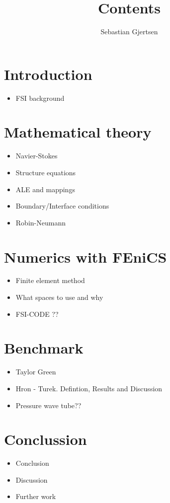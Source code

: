 
\usepackage{listings}
\usepackage{amsmath}
\title{Contents}
\author{Sebastian Gjertsen}

\maketitle

\section*{Introduction}
\begin{itemize}
\item FSI background 
\end{itemize}

\section*{Mathematical theory}
\begin{itemize}
\item Navier-Stokes
\item Structure equations
\item ALE and mappings
\item Boundary/Interface conditions
\item Robin-Neumann
\end{itemize}

\section*{Numerics with FEniCS}
\begin{itemize}
\item Finite element method
\item What spaces to use and why
\item FSI-CODE ??
\end{itemize}

\section*{Benchmark}
\begin{itemize}
\item Taylor Green
\item Hron - Turek. Defintion, Results and Discussion 
\item Pressure wave tube??
\end{itemize}

\section*{Conclussion}
\begin{itemize}
\item Conclusion
\item Discussion
\item Further work 
\end{itemize}


